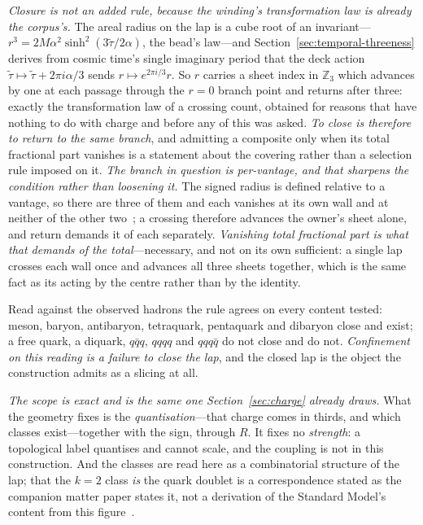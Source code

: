 \documentclass[11pt,a4paper]{article}
\theoremstyle{definition}
\begin{document}
\emph{Closure is not an added rule, because the winding's transformation law is already the corpus's.} The areal radius on the lap is a cube root of an invariant---$r^{3}=2M\alpha^{2}\sinh^{2}(3\tilde\tau/2\alpha)$, the bead's law---and Section~\ref{sec:temporal-threeness} derives from cosmic time's single imaginary period that the deck action $\tilde\tau\mapsto\tilde\tau+2\pi i\alpha/3$ sends $r\mapsto e^{2\pi i/3}r$. So $r$ carries a sheet index in $\mathbb{Z}_{3}$ which advances by one at each passage through the $r=0$ branch point and returns after three: exactly the transformation law of a crossing count, obtained for reasons that have nothing to do with charge and before any of this was asked. \emph{To close is therefore to return to the same branch}, and admitting a composite only when its total fractional part vanishes is a statement about the covering rather than a selection rule imposed on it. \emph{The branch in question is per-vantage, and that sharpens the condition rather than loosening it.} The signed radius is defined relative to a vantage, so there are three of them and each vanishes at its own wall and at neither of the other two~\cite{JanzenMatter}; a crossing therefore advances the owner's sheet alone, and return demands it of each separately. \emph{Vanishing total fractional part is what that demands of the total}---necessary, and not on its own sufficient: a single lap crosses each wall once and advances all three sheets together, which is the same fact as its acting by the centre rather than by the identity.

Read against the observed hadrons the rule agrees on every content tested: meson, baryon, antibaryon, tetraquark, pentaquark and dibaryon close and exist; a free quark, a diquark, $q\bar q q$, $qqqq$ and $qqq\bar q$ do not close and do not. \emph{Confinement on this reading is a failure to close the lap}, and the closed lap is the object the construction admits as a slicing at all.

\emph{The scope is exact and is the same one Section~\ref{sec:charge} already draws.} What the geometry fixes is the \emph{quantisation}---that charge comes in thirds, and which classes exist---together with the sign, through $R$. It fixes no \emph{strength}: a topological label quantises and cannot scale, and the coupling is not in this construction. And the classes are read here as a combinatorial structure of the lap; that the $k=2$ class \emph{is} the quark doublet is a correspondence stated as the companion matter paper states it, not a derivation of the Standard Model's content from this figure~\cite{JanzenMatter}.
\end{document}
